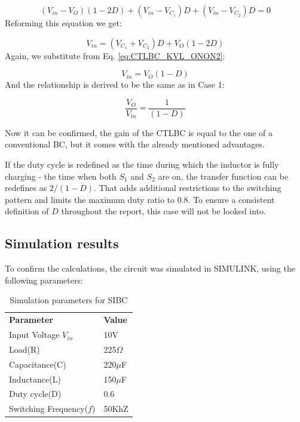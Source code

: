 \begin{equation}
	(V_{in}-V_O)(1-2D)+(V_{in} - V_{C_1})D+(V_{in} - V_{C_2})D=0
	\label{eq:CTLBC_CASE2_2}
\end{equation}
Reforming this equation we get: 

\begin{equation}
	V_{in}=(V_{C_1} + V_{C_2})D+V_O(1-2D)
	\label{eq:CTLBC_CASE2_3}
\end{equation}
Again, we substitute from Eq. \ref{eq:CTLBC_KVL_ONON2}:

\begin{equation}
	V_{in}=V_{O}(1-D)
	\label{eq:CTLBC_CASE2_4}
\end{equation}
And the relationship is derived to be the same as in Case 1:

\begin{equation}
	\frac{V_O}{V_{in}}=\frac{1}{(1-D)}
	\label{eq:CTLBC_CASE2_5}
\end{equation}

Now it can be confirmed, the gain of the CTLBC is equal to the one of a conventional BC, but it comes with the already mentioned advantages. 

If the duty cycle is redefined as the time during which the inductor is fully charging - the time when both $S_1$ and $S_2$ are on, the transfer function can be redefines as $2/(1-D)$. That adds additional restrictions to the switching pattern and limits the maximum duty ratio to 0.8. To ensure a consistent definition of $D$ throughout the report, this case will not be looked into.  

\subsection{Simulation results}

To confirm the calculations, the circuit was simulated in SIMULINK, using the following parameters: 

\begin{table}[H]
\begin{center}
\caption {Simulation parameters for SIBC} \label{tab:CTLBC} 
\begin{tabular}{|l|l|}
\cline{1-2}
\textbf{Parameter} & \textbf{Value}  \\ \cline{1-2}
Input Voltage $V_{in}$          &      10V   \\ \cline{1-2}
Load(R)   & 225$\Omega$           \\ \cline{1-2}
Capacitance(C)          &       220$\mu$F     \\ \cline{1-2}
Inductance(L)          &      150$\mu$F      \\ \cline{1-2}
Duty cycle(D)          &     0.6       \\ \cline{1-2}
Switching Frequency($f$)          &      50KhZ      \\ \cline{1-2}
\end{tabular}
\end{center}
\end{table}

